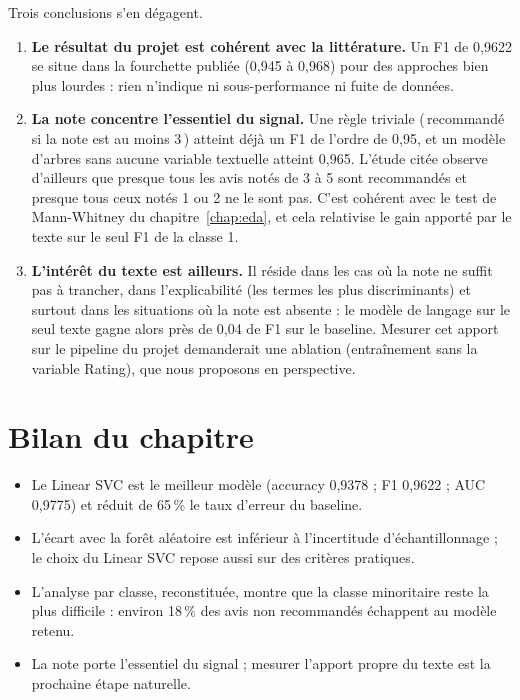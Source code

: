 \documentclass[11pt,a4paper]{report}
\def\og{\guillemotleft\nobreak\,}%
\def\fg{\unskip\nobreak\,\guillemotright}%
\newcommand{\gl}[1]{\og #1\fg{}}       %
\numberwithin{equation}{chapter}
\begin{document}
Trois conclusions s'en dégagent.
\begin{enumerate}
\item \textbf{Le résultat du projet est cohérent avec la littérature.} Un F1 de 0,9622 se situe dans la fourchette publiée (0,945 à 0,968) pour des approches bien plus lourdes : rien n'indique ni sous-performance ni fuite de données.
\item \textbf{La note concentre l'essentiel du signal.} Une règle triviale (\gl{recommandé si la note est au moins 3}) atteint déjà un F1 de l'ordre de 0,95, et un modèle d'arbres sans aucune variable textuelle atteint 0,965. L'étude citée observe d'ailleurs que presque tous les avis notés de 3 à 5 sont recommandés et presque tous ceux notés 1 ou 2 ne le sont pas. C'est cohérent avec le test de Mann-Whitney du chapitre~\ref{chap:eda}, et cela relativise le gain apporté par le texte sur le seul F1 de la classe 1.
\item \textbf{L'intérêt du texte est ailleurs.} Il réside dans les cas où la note ne suffit pas à trancher, dans l'explicabilité (les termes les plus discriminants) et surtout dans les situations où la note est absente : le modèle de langage sur le seul texte gagne alors près de 0,04 de F1 sur le baseline. Mesurer cet apport sur le pipeline du projet demanderait une ablation (entraînement sans la variable Rating), que nous proposons en perspective.
\end{enumerate}

\section{Bilan du chapitre}
\begin{itemize}
\item Le Linear SVC est le meilleur modèle (accuracy 0,9378 ; F1 0,9622 ; AUC 0,9775) et réduit de 65\,\% le taux d'erreur du baseline.
\item L'écart avec la forêt aléatoire est inférieur à l'incertitude d'échantillonnage ; le choix du Linear SVC repose aussi sur des critères pratiques.
\item L'analyse par classe, reconstituée, montre que la classe minoritaire reste la plus difficile : environ 18\,\% des avis non recommandés échappent au modèle retenu.
\item La note porte l'essentiel du signal ; mesurer l'apport propre du texte est la prochaine étape naturelle.
\end{itemize}
\end{document}
